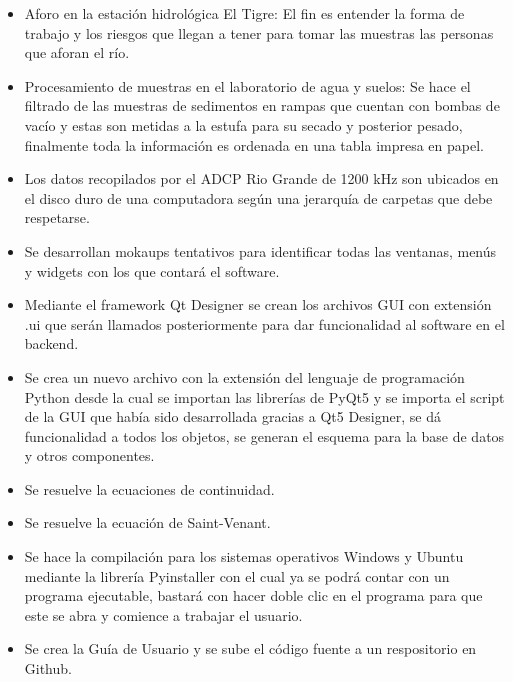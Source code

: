 \documentclass[12pt,a4paper]{report}
\begin{document}
\begin{itemize}
\item Aforo en la estación hidrológica El Tigre: El fin es entender la forma de trabajo y los riesgos que llegan a tener para tomar las muestras las personas que aforan el río.
\item Procesamiento de muestras en el laboratorio de agua y suelos: Se hace el filtrado de las muestras de sedimentos en rampas que cuentan con bombas de vacío y estas son metidas a la estufa para su secado y posterior pesado, finalmente toda la información es ordenada en una tabla impresa en papel.
\item Los datos recopilados por el ADCP Rio Grande de 1200 kHz son ubicados en el disco duro de una computadora según una jerarquía de carpetas que debe respetarse.
\item Se desarrollan mokaups tentativos para identificar todas las ventanas, menús y widgets con los que contará el software.
\item Mediante el framework Qt Designer se crean los archivos GUI con extensión .ui que serán llamados posteriormente para dar funcionalidad al software en el backend.
\item Se crea un nuevo archivo con la extensión del lenguaje de programación Python desde la cual se importan las librerías de PyQt5 y se importa el script de la GUI que había sido desarrollada gracias a Qt5 Designer, se dá funcionalidad a todos los objetos, se generan el esquema para la base de datos y otros componentes.
\item Se resuelve la ecuaciones de continuidad.
\item Se resuelve la ecuación de Saint-Venant.
\item Se hace la compilación para los sistemas operativos Windows y Ubuntu mediante la librería Pyinstaller con el cual ya se podrá contar con un programa ejecutable, bastará con hacer doble clic en el programa para que este se abra y comience a trabajar el usuario.
\item Se crea la Guía de Usuario y se sube el código fuente a un respositorio en Github.






\end{itemize}


\end{document}
